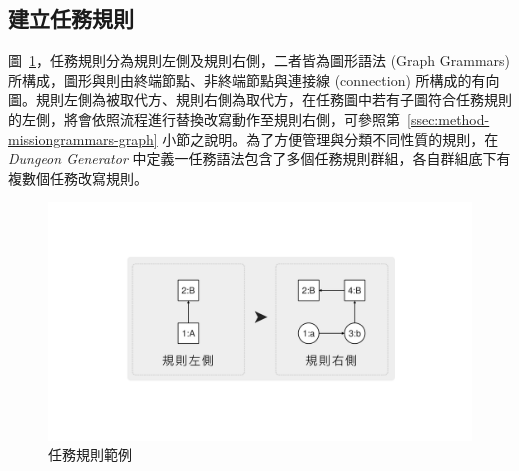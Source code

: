 


\subsection{建立任務規則}
\label{ssec:method-missiongrammars-rules}

圖~\ref{fig:missiongrammars-tutorial}，任務規則分為規則左側及規則右側，二者皆為圖形語法 (Graph Grammars) 所構成，圖形與則由終端節點、非終端節點與連接線 (connection) 所構成的有向圖。規則左側為被取代方、規則右側為取代方，在任務圖中若有子圖符合任務規則的左側，將會依照流程進行替換改寫動作至規則右側，可參照第~\ref{ssec:method-missiongrammars-graph} 小節之說明。為了方便管理與分類不同性質的規則，在 \textit{Dungeon Generator} 中定義一任務語法包含了多個任務規則群組，各自群組底下有複數個任務改寫規則。

\begin{figure}[!htb]
  \begin{center}
    \includegraphics[width=1.0\textwidth]{figures/missiongrammars-tutorial.pdf}
    \caption{任務規則範例}
    \label{fig:missiongrammars-tutorial}
  \end{center}
\end{figure}

